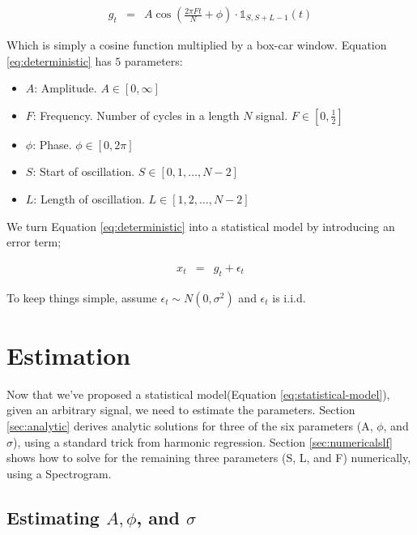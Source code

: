 \documentclass[11pt]{article}
\theoremstyle{plain}
\theoremstyle{definition}
\begin{document}
\begin{eqnarray}
	\label{eq:deterministic}
	g_t &=& A \cos(\frac{2 \pi F t}{N} + \phi) \cdot \mathbb{1}_{S, S + L - 1}(t)
\end{eqnarray}

\noindent Which is simply a cosine function multiplied by a box-car window. Equation \ref{eq:deterministic} has $5$ parameters:

\begin{itemize}
\setlength\itemsep{.1em}
	\item $A$: Amplitude. $A \in [0, \infty]$
	\item $F$: Frequency. Number of cycles in a length $N$ signal. $F \in [0, \frac{1}{2}]$
	\item $\phi$: Phase. $\phi \in [0, 2 \pi]$
	\item $S$: Start of oscillation. $S \in [0, 1, \ldots, N - 2]$
	\item $L$: Length of oscillation. $L \in [1, 2, \ldots, N - 2]$
\end{itemize}

\noindent We turn Equation \ref{eq:deterministic} into a statistical model by introducing an error term;

\begin{eqnarray}
\label{eq:statistical-model}
x_t &=& g_t + \epsilon_t 
\end{eqnarray}

\noindent To keep things simple, assume $\epsilon_t \sim N(0, \sigma^2)$ and $\epsilon_t$ is i.i.d.

\section{Estimation}
\label{sec:estimation}


Now that we've proposed a statistical model(Equation \ref{eq:statistical-model}), given an arbitrary signal, we need to estimate the parameters. Section \ref{sec:analytic} derives analytic solutions for three of the six parameters (A, $\phi$, and $\sigma$), using a standard trick from harmonic regression. Section \ref{sec:numericalslf} shows how to solve for the remaining three parameters (S, L, and F) numerically, using a Spectrogram. 

\subsection{Estimating $A, \phi$, and $\sigma$}
\label{sec:aphisigma}
\end{document}
